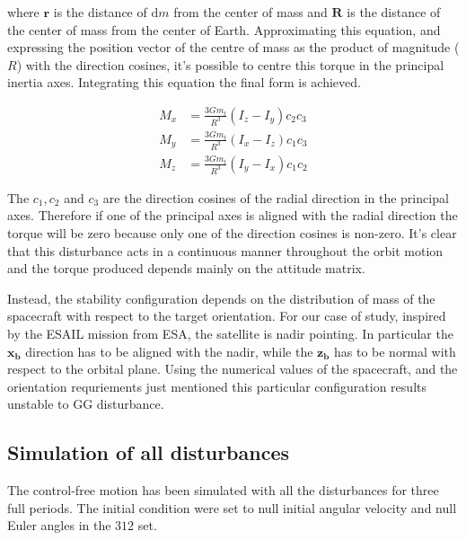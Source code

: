 where $\boldsymbol{r}$ is the distance of $\mathrm{d}m$ from the center of mass and $\boldsymbol{R}$ is the distance of the center of mass from the center of Earth.
Approximating this equation, and expressing the position vector of the centre of mass as the product of magnitude (\( R \)) with the direction cosines, 
it’s possible to centre this torque in the principal inertia axes. Integrating this equation the final form is achieved.

\begin{equation}
	\begin{aligned}
		M_x &= \frac{3Gm_t}{R^3} (I_z - I_y)c_2c_3 \\
		M_y &= \frac{3Gm_t}{R^3} (I_x - I_z)c_1c_3 \\
		M_z &= \frac{3Gm_t}{R^3} (I_y - I_x)c_1c_2
	\end{aligned}
\end{equation}


The \( c_1, c_2 \) and \( c_3 \) are the direction cosines of the radial direction in the principal axes. 
Therefore if one of the principal axes is aligned with the radial direction the torque will be zero because only one of the direction cosines is non-zero.
It's clear that this disturbance acts in a continuous manner throughout the orbit motion and the torque produced depends mainly on the attitude matrix.

Instead, the stability configuration depends on the distribution of mass of the spacecraft with respect to the target orientation. For our case of study, 
inspired by the ESAIL mission from ESA, the satellite is nadir pointing. In particular the $\boldsymbol{x_b}$ direction has to be aligned with the nadir, while the $\boldsymbol{z_b}$ has to be normal with respect to the orbital plane. Using the numerical values of the spacecraft, and the orientation requriements just mentioned this particular configuration results unstable to GG disturbance.


\subsection{Simulation of all disturbances}
\label{subsec:sim_disturbances}


The control-free motion has been simulated with all the disturbances for three full periods. 
The initial condition were set to null initial angular velocity and 
null Euler angles in the $312$ set.


